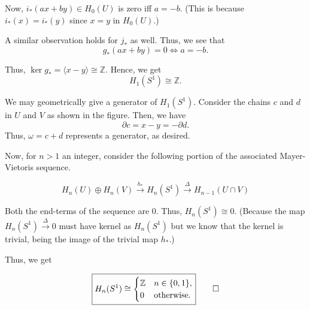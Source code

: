 \documentclass[12pt]{article}
\begin{document}
\begin{ex}
	Now, $i_*(ax + by) \in H_0(U)$ is zero iff $a = -b.$ (This is because $i_*(x) = i_*(y)$ since $x = y$ in $H_0(U).$)

	A similar observation holds for $j_*$ as well. Thus, we see that
	\begin{equation*} 
		g_*(ax + by) = 0 \iff a = -b.
	\end{equation*}

	Thus, $\ker g_* = \langle x - y\rangle \cong \mathbb{Z}.$ Hence, we get 
	\begin{equation*} 
		H_1(S^1) \cong \mathbb{Z}.
	\end{equation*}

	We may geometrically give a generator of $H_1(S^1).$ Consider the chains $c$ and $d$ in $U$ and $V$ as shown in the figure. Then, we have 
	\begin{equation*} 
		\partial c = x - y = -\partial d.
	\end{equation*}
	Thus, $\omega = c + d$ represents a generator, as desired.

	Now, for $n > 1$ an integer, consider the following portion of the associated Mayer-Vietoris sequence.

	\begin{equation*} 
		H_n(U) \oplus H_n(V) \overset{h_*}{\longrightarrow} H_n(S^1) \overset{\Delta}{\longrightarrow} H_{n-1}(U \cap V)
	\end{equation*}

	Both the end-terms of the sequence are $0.$ Thus, $H_n(S^1) \cong 0.$ (Because the map $H_n(S^1) \overset{\Delta}{\longrightarrow} 0$ must have kernel as $H_n(S^1)$ but we know that the kernel is trivial, being the image of the trivial map $h_*.$) 

	Thus, we get

	\begin{equation*} 
		\boxed{H_n(S^1) \cong \begin{cases}
			\mathbb{Z} & n \in \{0, 1\},\\
			0 & \text{otherwise}.
		\end{cases}}		
		\qedhere
	\end{equation*}
\end{ex}
\end{document}
